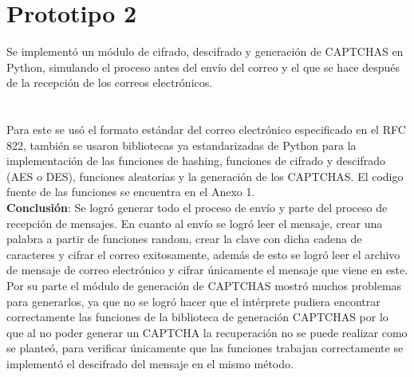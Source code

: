 \section{Prototipo 2}
Se implementó un módulo de cifrado, descifrado y generación de CAPTCHAS en Python, simulando el proceso antes del envío del correo y el que se hace después de la recepción de los correos electrónicos.\\\\\\
Para este se usó el formato estándar del correo electrónico especificado en el RFC 822, también se usaron bibliotecas ya estandarizadas de Python para la implementación de las funciones de hashing, funciones de cifrado y descifrado (AES o DES), funciones aleatorias y la generación de los CAPTCHAS. El codigo fuente de las funciones se encuentra en el Anexo 1.\\

\textbf{Conclusión}:
Se logró generar todo el proceso de envío y parte del proceso de recepción de mensajes. En cuanto al envío se logró leer el mensaje, crear una palabra a partir de funciones random, crear la clave con dicha cadena de caracteres y cifrar el correo exitosamente, además de esto se logró leer el archivo de mensaje de correo electrónico y cifrar únicamente el mensaje que viene en este.\\
Por su parte el módulo de generación de CAPTCHAS mostró muchos problemas para generarlos, ya que no se logró hacer que el intérprete pudiera encontrar correctamente las funciones de la biblioteca de generación CAPTCHAS por lo que al no poder generar un CAPTCHA la recuperación no se puede realizar como se planteó, para verificar únicamente que las funciones trabajan correctamente se implementó el descifrado del mensaje en el mismo método.\\



